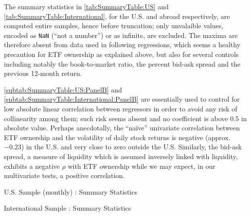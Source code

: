The summary statistics in \autoref{tab:SummaryTable:US} and \autoref{tab:SummaryTable:International}, for the U.S. and abroad respectively, are computed entire samples, hence before truncation; only unvalaible values, encoded as \texttt{NaN} (``not a number'') or as infinite, are excluded. The maxima are therefore absent from data used in following regressions, which seems a healthy precaution for ETF ownership as explained above, but also for several controls including notably the book-to-market ratio, the percent bid-ask spread and the previous 12-month return.

\autoref{subtab:SummaryTable:US:PanelB} and \autoref{subtab:SummaryTable:International:PanelB} are essentially used to control for low absolute linear correlation between regressors in order to avoid any risk of collinearity among them; such risk seems absent and no coefficient is above 0.5 in absolute value. Perhaps anecdotally, the ``naïve'' univariate correlation between ETF ownership and the volatility of daily stock returns is negative (approx. $-0.23$) in the U.S. and very close to zero outside the U.S. Similarly, the bid-ask spread, a measure of liquidity which is assumed inversely linked with liquidity, exhibits a negative $\rho$ with ETF ownership while we may expect, in our multivariate tests, a positive correlation.
{\linespread{1.0}
\begin{landscape}
\begin{table}[htbp]
\caption{U.S. Sample (monthly) : Summary Statistics}
\label{tab:SummaryTable:US}
\begin{subtable}[t]{\linewidth}
\label{subtab:SummaryTable:US:PanelA}

\end{subtable}
\medskip
\newline
\begin{subtable}[t]{\linewidth}
\label{subtab:SummaryTable:US:PanelB}

\end{subtable}
\end{table}
\clearpage
\begin{table}[htbp]
\caption{International Sample : Summary Statistics}
\label{tab:SummaryTable:International}
\begin{subtable}[t]{\linewidth}
\label{subtab:SummaryTable:International:PanelA}

\end{subtable}
\medskip
\newline
\begin{subtable}[t]{\linewidth}
\label{subtab:SummaryTable:International:PanelB}

\end{subtable}
\end{table}
\end{landscape}
}
